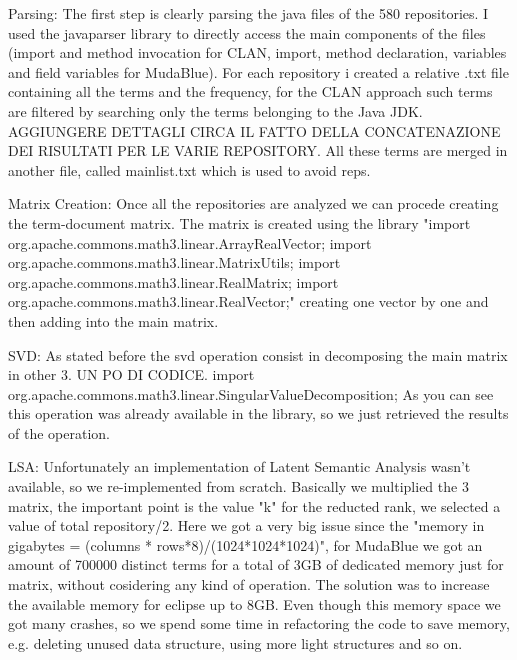 Parsing: The first step is clearly parsing the java files of the 580 repositories. I used the javaparser library to directly access
the main components of the files (import and method invocation for CLAN, import, method declaration, variables and field variables for MudaBlue). For each repository i created a relative .txt file containing all the terms and the frequency, for the CLAN approach such terms are filtered by searching only the terms belonging to the Java JDK. AGGIUNGERE DETTAGLI CIRCA IL FATTO DELLA CONCATENAZIONE DEI RISULTATI PER LE VARIE REPOSITORY. All these terms are merged in another file, called mainlist.txt which is used to avoid reps.

Matrix Creation: Once all the repositories are analyzed we can procede creating the term-document matrix. The matrix is created using the library 
"import org.apache.commons.math3.linear.ArrayRealVector;
import org.apache.commons.math3.linear.MatrixUtils;
import org.apache.commons.math3.linear.RealMatrix;
import org.apache.commons.math3.linear.RealVector;" creating one vector by one and then adding into the main matrix. 

SVD: As stated before the svd operation consist in decomposing the main matrix in other 3. UN PO DI CODICE.
import org.apache.commons.math3.linear.SingularValueDecomposition;
As you can see this operation was already available in the library, so we just retrieved the results of the operation.

LSA: Unfortunately an implementation of Latent Semantic Analysis wasn't available, so we re-implemented from scratch.
Basically we multiplied the 3 matrix, the important point is the value "k" for the reducted rank, we selected a value of total repository/2. Here we got a very big issue since the "memory in gigabytes = (columns * rows*8)/(1024*1024*1024)", for MudaBlue we got an amount of 700000 distinct terms for a total of 3GB of dedicated memory just for matrix, without cosidering any kind of operation. The solution was to increase the available memory for eclipse up to 8GB. Even though this memory space we got many crashes, so we spend some time in refactoring the code to save memory, e.g. deleting unused data structure, using more light structures and so on.


